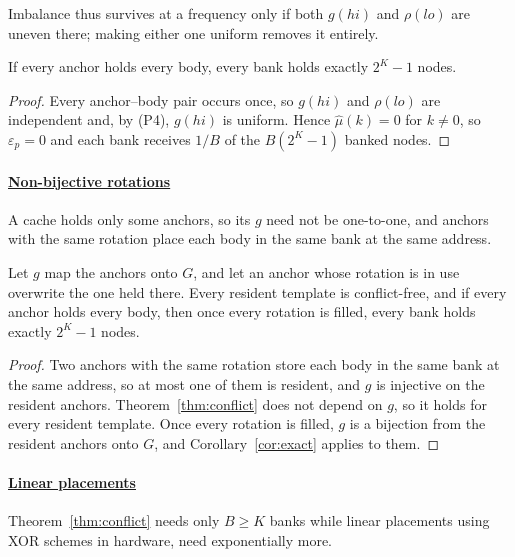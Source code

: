 Imbalance thus survives at a frequency only if both $g(hi)$ and $\rho(lo)$ are uneven
there; making either one uniform removes it entirely.

\begin{corollary}\label{cor:exact}
	If every anchor holds every body, every bank holds exactly $2^K - 1$ nodes.
\end{corollary}

\begin{proof}
	Every anchor--body pair occurs once, so $g(hi)$ and $\rho(lo)$ are independent and, by
	(P4), $g(hi)$ is uniform. Hence $\hat\mu(k) = 0$ for $k \neq 0$, so $\varepsilon_p = 0$
	and each bank receives $1/B$ of the $B(2^K - 1)$ banked nodes.
\end{proof}

\paragraph{\underline{Non-bijective rotations}}
A cache holds only some anchors, so its $g$ need not be one-to-one, and anchors with the
same rotation place each body in the same bank at the same address.

\begin{theorem}\label{thm:cache}
	Let $g$ map the anchors onto $G$, and let an anchor whose rotation is in use overwrite the
	one held there. Every resident template is conflict-free, and if every anchor holds every
	body, then once every rotation is filled, every bank holds exactly $2^K - 1$ nodes.
\end{theorem}

\begin{proof}
	Two anchors with the same rotation store each body in the same bank at the same address,
	so at most one of them is resident, and $g$ is injective on the resident anchors.
	Theorem~\ref{thm:conflict} does not depend on $g$, so it holds for every resident
	template. Once every rotation is filled, $g$ is a bijection from the resident anchors onto
	$G$, and Corollary~\ref{cor:exact} applies to them.
\end{proof}

\paragraph{\underline{Linear placements}}
Theorem~\ref{thm:conflict} needs only $B \ge K$ banks while linear placements using XOR schemes in hardware, need exponentially more.

